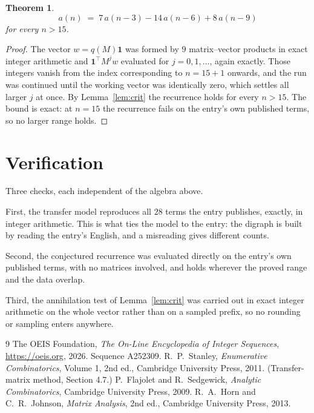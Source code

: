 \documentclass[11pt,a4paper]{article}
\theoremstyle{plain}
\newtheorem{theorem}{Theorem}
\theoremstyle{definition}
\begin{document}
\begin{theorem}
\[
a(n)\;=\;7\,a(n-3) - 14\,a(n-6) + 8\,a(n-9)
\]
for every $n>15$.
\end{theorem}

\begin{proof}
The vector $w=q(M)\mathbf{1}$ was formed by $9$ matrix--vector products in exact
integer arithmetic and $\mathbf{1}^{\!\top}M^{j}w$ evaluated for $j=0,1,\dots$, again
exactly. Those integers vanish from the index corresponding to $n=15+1$ onwards, and the
run was continued until the working vector was identically zero, which settles all larger $j$
at once. By Lemma~\ref{lem:crit} the recurrence holds for every $n>15$. The bound is exact: at $n=15$ the recurrence fails on the entry's own published terms, so no larger range holds.
\end{proof}

\section{Verification}

Three checks, each independent of the algebra above.

First, the transfer model reproduces all $28$ terms the entry publishes, exactly, in
integer arithmetic. This is what ties the model to the entry: the digraph is built by reading
the entry's English, and a misreading gives different counts.

Second, the conjectured recurrence was evaluated directly on the entry's own published terms,
with no matrices involved, and holds wherever the proved range and the data overlap.

Third, the annihilation test of Lemma~\ref{lem:crit} was carried out in exact integer
arithmetic on the whole vector rather than on a sampled prefix, so no rounding or sampling
enters anywhere.

\begin{thebibliography}{9}
 The OEIS Foundation, \emph{The On-Line Encyclopedia of Integer
Sequences}, \url{https://oeis.org}, 2026. Sequence A252309.
 R.~P.~Stanley, \emph{Enumerative Combinatorics}, Volume 1, 2nd ed.,
Cambridge University Press, 2011. (Transfer-matrix method, Section 4.7.)
 P.~Flajolet and R.~Sedgewick, \emph{Analytic Combinatorics}, Cambridge
University Press, 2009.
 R.~A.~Horn and C.~R.~Johnson, \emph{Matrix Analysis}, 2nd ed., Cambridge
University Press, 2013.
\end{thebibliography}
\end{document}
